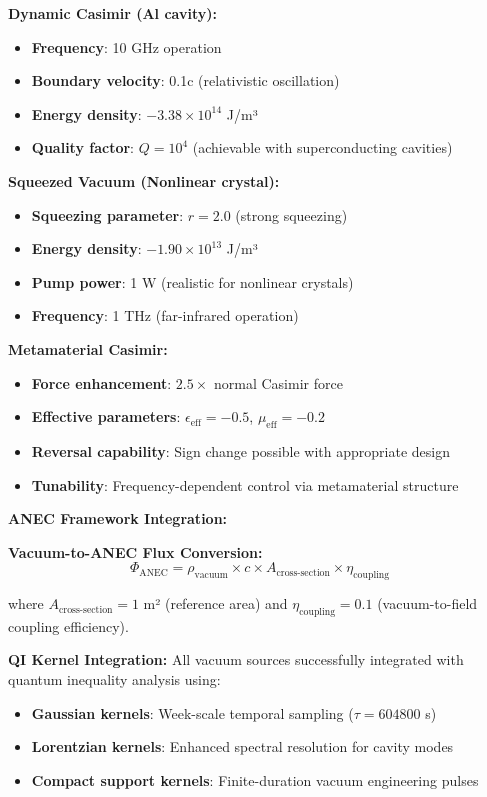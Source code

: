 \documentclass[11pt]{article}
\begin{document}
\textbf{Dynamic Casimir (Al cavity):}
\begin{itemize}
    \item \textbf{Frequency}: 10 GHz operation
    \item \textbf{Boundary velocity}: 0.1c (relativistic oscillation)
    \item \textbf{Energy density}: $-3.38 \times 10^{14}$ J/m³
    \item \textbf{Quality factor}: $Q = 10^4$ (achievable with superconducting cavities)
\end{itemize}

\textbf{Squeezed Vacuum (Nonlinear crystal):}
\begin{itemize}
    \item \textbf{Squeezing parameter}: $r = 2.0$ (strong squeezing)
    \item \textbf{Energy density}: $-1.90 \times 10^{13}$ J/m³
    \item \textbf{Pump power}: 1 W (realistic for nonlinear crystals)
    \item \textbf{Frequency}: 1 THz (far-infrared operation)
\end{itemize}

\textbf{Metamaterial Casimir:}
\begin{itemize}
    \item \textbf{Force enhancement}: $2.5 \times$ normal Casimir force
    \item \textbf{Effective parameters}: $\epsilon_{\text{eff}} = -0.5$, $\mu_{\text{eff}} = -0.2$
    \item \textbf{Reversal capability}: Sign change possible with appropriate design
    \item \textbf{Tunability}: Frequency-dependent control via metamaterial structure
\end{itemize}

\textbf{ANEC Framework Integration:}

\textbf{Vacuum-to-ANEC Flux Conversion:}
$$\Phi_{\text{ANEC}} = \rho_{\text{vacuum}} \times c \times A_{\text{cross-section}} \times \eta_{\text{coupling}}$$

where $A_{\text{cross-section}} = 1$ m² (reference area) and $\eta_{\text{coupling}} = 0.1$ (vacuum-to-field coupling efficiency).

\textbf{QI Kernel Integration:} All vacuum sources successfully integrated with quantum inequality analysis using:
\begin{itemize}
    \item \textbf{Gaussian kernels}: Week-scale temporal sampling ($\tau = 604800$ s)
    \item \textbf{Lorentzian kernels}: Enhanced spectral resolution for cavity modes
    \item \textbf{Compact support kernels}: Finite-duration vacuum engineering pulses
\end{itemize}
\end{document}

